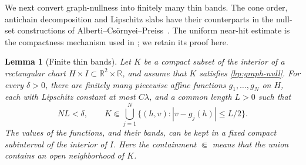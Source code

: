 \documentclass[11pt]{article}
\numberwithin{equation}{section}
\newtheorem{lemma}[theorem]{Lemma}
\theoremstyle{definition}
\theoremstyle{remark}
\newcommand{\R}{\mathbb R}
\begin{document}
We next convert graph-nullness into finitely many thin bands.  The
cone order, antichain decomposition and Lipschitz slabs have their
counterparts in the null-set constructions of
Alberti--Cs\"ornyei--Preiss~\cite[Sections~2.2 and~3]{AlbertiCsornyeiPreiss2010}.
The uniform near-hit estimate is the compactness mechanism used in
\cite[Lemma~4.12, Step~1]{AlbertiMarchese2016}; we retain its proof here.

\begin{lemma}[Finite thin bands]\label{hp:thin-bands}
Let $K$ be a compact subset of the interior of a rectangular chart
$H\times I\subset\R^2\times\R$, and assume that $K$ satisfies
\eqref{hp:graph-null}.  For every $\delta>0$, there are finitely many
piecewise affine functions $g_1,\dots,g_N$ on $H$, each with
Lipschitz constant at most $C\lambda$, and a common length $L>0$
such that
\[
 NL<\delta,
 \qquad
 K\Subset\bigcup_{j=1}^N
       \{(h,v):|v-g_j(h)|\le L/2\}.
\]
The values of the functions, and their bands, can be kept in a fixed
compact subinterval of the interior of $I$.  Here the containment
$\Subset$ means that the union contains an open neighborhood of $K$.
\end{lemma}
\end{document}
